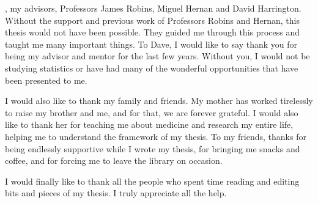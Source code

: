 
, my advisors, Professors James Robins, Miguel Hernan and David Harrington.  Without the support and previous work of Professors Robins and Hernan, this thesis would not have been possible.  They guided me through this process and taught me many important things.  To Dave, I would like to say thank you for being my advisor and mentor for the last few years.  Without you, I would not be studying statistics or have had many of the wonderful opportunities that have been presented to me.  

I would also like to thank my family and friends.  My mother has worked tirelessly to raise my brother and me, and for that, we are forever grateful.  I would also like to thank her for teaching me about medicine and research my entire life, helping me to understand the framework of my thesis.  To my friends, thanks for being endlessly supportive while I wrote my thesis, for bringing me snacks and coffee, and for forcing me to leave the library on occasion. 

I would finally like to thank all the people who spent time reading and editing bits and pieces of my thesis.  I truly appreciate all the help.  